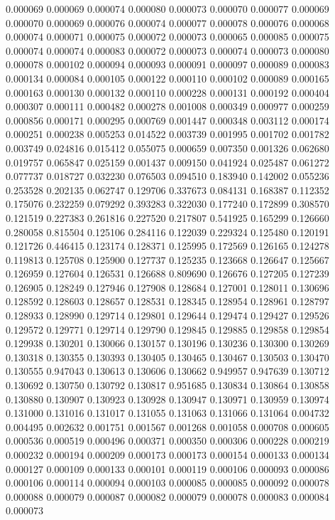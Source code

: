 0.000069
0.000069
0.000074
0.000080
0.000073
0.000070
0.000077
0.000069
0.000070
0.000069
0.000076
0.000074
0.000077
0.000078
0.000076
0.000068
0.000074
0.000071
0.000075
0.000072
0.000073
0.000065
0.000085
0.000075
0.000074
0.000074
0.000083
0.000072
0.000073
0.000074
0.000073
0.000080
0.000078
0.000102
0.000094
0.000093
0.000091
0.000097
0.000089
0.000083
0.000134
0.000084
0.000105
0.000122
0.000110
0.000102
0.000089
0.000165
0.000163
0.000130
0.000132
0.000110
0.000228
0.000131
0.000192
0.000404
0.000307
0.000111
0.000482
0.000278
0.001008
0.000349
0.000977
0.000259
0.000856
0.000171
0.000295
0.000769
0.001447
0.000348
0.003112
0.000174
0.000251
0.000238
0.005253
0.014522
0.003739
0.001995
0.001702
0.001782
0.003749
0.024816
0.015412
0.055075
0.000659
0.007350
0.001326
0.062680
0.019757
0.065847
0.025159
0.001437
0.009150
0.041924
0.025487
0.061272
0.077737
0.018727
0.032230
0.076503
0.094510
0.183940
0.142002
0.055236
0.253528
0.202135
0.062747
0.129706
0.337673
0.084131
0.168387
0.112352
0.175076
0.232259
0.079292
0.393283
0.322030
0.177240
0.172899
0.308570
0.121519
0.227383
0.261816
0.227520
0.217807
0.541925
0.165299
0.126660
0.280058
0.815504
0.125106
0.284116
0.122039
0.229324
0.125480
0.120191
0.121726
0.446415
0.123174
0.128371
0.125995
0.172569
0.126165
0.124278
0.119813
0.125708
0.125900
0.127737
0.125235
0.123668
0.126647
0.125667
0.126959
0.127604
0.126531
0.126688
0.809690
0.126676
0.127205
0.127239
0.126905
0.128249
0.127946
0.127908
0.128684
0.127001
0.128011
0.130696
0.128592
0.128603
0.128657
0.128531
0.128345
0.128954
0.128961
0.128797
0.128933
0.128990
0.129714
0.129801
0.129644
0.129474
0.129427
0.129526
0.129572
0.129771
0.129714
0.129790
0.129845
0.129885
0.129858
0.129854
0.129938
0.130201
0.130066
0.130157
0.130196
0.130236
0.130300
0.130269
0.130318
0.130355
0.130393
0.130405
0.130465
0.130467
0.130503
0.130470
0.130555
0.947043
0.130613
0.130606
0.130662
0.949957
0.947639
0.130712
0.130692
0.130750
0.130792
0.130817
0.951685
0.130834
0.130864
0.130858
0.130880
0.130907
0.130923
0.130928
0.130947
0.130971
0.130959
0.130974
0.131000
0.131016
0.131017
0.131055
0.131063
0.131066
0.131064
0.004732
0.004495
0.002632
0.001751
0.001567
0.001268
0.001058
0.000708
0.000605
0.000536
0.000519
0.000496
0.000371
0.000350
0.000306
0.000228
0.000219
0.000232
0.000194
0.000209
0.000173
0.000173
0.000154
0.000133
0.000134
0.000127
0.000109
0.000133
0.000101
0.000119
0.000106
0.000093
0.000086
0.000106
0.000114
0.000094
0.000103
0.000085
0.000085
0.000092
0.000078
0.000088
0.000079
0.000087
0.000082
0.000079
0.000078
0.000083
0.000084
0.000073

